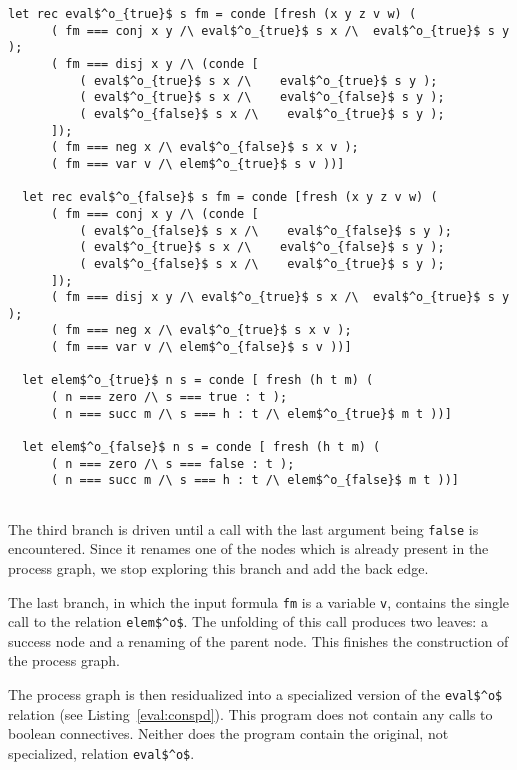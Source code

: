 \begin{figure*}[!t]
  \centering
  \begin{minipage}{0.65\textwidth}
    \begin{lstlisting}[label={eval:conspd}, caption={Specialized evaluator of propositional formulas}, captionpos=b, frame=tb]
  let rec eval$^o_{true}$ s fm = conde [fresh (x y z v w) (
      ( fm === conj x y /\ eval$^o_{true}$ s x /\  eval$^o_{true}$ s y );
      ( fm === disj x y /\ (conde [
          ( eval$^o_{true}$ s x /\    eval$^o_{true}$ s y );
          ( eval$^o_{true}$ s x /\    eval$^o_{false}$ s y );
          ( eval$^o_{false}$ s x /\    eval$^o_{true}$ s y );
      ]);
      ( fm === neg x /\ eval$^o_{false}$ s x v );
      ( fm === var v /\ elem$^o_{true}$ s v ))]

  let rec eval$^o_{false}$ s fm = conde [fresh (x y z v w) (
      ( fm === conj x y /\ (conde [
          ( eval$^o_{false}$ s x /\    eval$^o_{false}$ s y );
          ( eval$^o_{true}$ s x /\    eval$^o_{false}$ s y );
          ( eval$^o_{false}$ s x /\    eval$^o_{true}$ s y );
      ]);
      ( fm === disj x y /\ eval$^o_{true}$ s x /\  eval$^o_{true}$ s y );
      ( fm === neg x /\ eval$^o_{true}$ s x v );
      ( fm === var v /\ elem$^o_{false}$ s v ))]

  let elem$^o_{true}$ n s = conde [ fresh (h t m) (
      ( n === zero /\ s === true : t );
      ( n === succ m /\ s === h : t /\ elem$^o_{true}$ m t ))]

  let elem$^o_{false}$ n s = conde [ fresh (h t m) (
      ( n === zero /\ s === false : t );
      ( n === succ m /\ s === h : t /\ elem$^o_{false}$ m t ))]


    \end{lstlisting}
  \end{minipage}
\end{figure*}

The third branch is driven until a call with the last argument being \lstinline{false} is encountered.
Since it renames one of the nodes which is already present in the process graph, we stop exploring this branch and add the back edge.

The last branch, in which the input formula \lstinline{fm} is a variable \lstinline{v}, contains the single call to the relation \lstinline{elem$^o$}.
The unfolding of this call produces two leaves: a success node and a renaming of the parent node.
This finishes the construction of the process graph.

The process graph is then residualized into a specialized version of the \lstinline{eval$^o$} relation (see Listing~\ref{eval:conspd}).
This program does not contain any calls to boolean connectives.
Neither does the program contain the original, not specialized, relation \lstinline{eval$^o$}.


